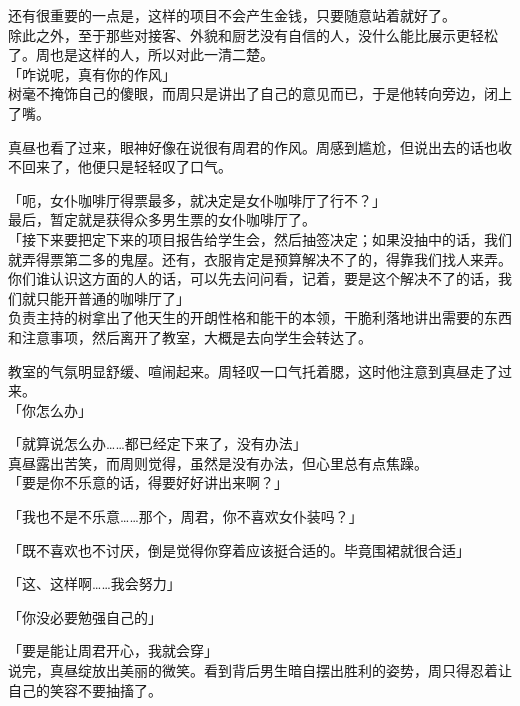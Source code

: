 还有很重要的一点是，这样的项目不会产生金钱，只要随意站着就好了。\\

除此之外，至于那些对接客、外貌和厨艺没有自信的人，没什么能比展示更轻松了。周也是这样的人，所以对此一清二楚。\\

「咋说呢，真有你的作风」\\

树毫不掩饰自己的傻眼，而周只是讲出了自己的意见而已，于是他转向旁边，闭上了嘴。

真昼也看了过来，眼神好像在说很有周君的作风。周感到尴尬，但说出去的话也收不回来了，他便只是轻轻叹了口气。\\

\vspace{2\baselineskip}

「呃，女仆咖啡厅得票最多，就决定是女仆咖啡厅了行不？」\\

最后，暂定就是获得众多男生票的女仆咖啡厅了。\\

「接下来要把定下来的项目报告给学生会，然后抽签决定；如果没抽中的话，我们就弄得票第二多的鬼屋。还有，衣服肯定是预算解决不了的，得靠我们找人来弄。你们谁认识这方面的人的话，可以先去问问看，记着，要是这个解决不了的话，我们就只能开普通的咖啡厅了」\\

负责主持的树拿出了他天生的开朗性格和能干的本领，干脆利落地讲出需要的东西和注意事项，然后离开了教室，大概是去向学生会转达了。

教室的气氛明显舒缓、喧闹起来。周轻叹一口气托着腮，这时他注意到真昼走了过来。\\

「你怎么办」

「就算说怎么办……都已经定下来了，没有办法」\\

真昼露出苦笑，而周则觉得，虽然是没有办法，但心里总有点焦躁。\\

「要是你不乐意的话，得要好好讲出来啊？」

「我也不是不乐意……那个，周君，你不喜欢女仆装吗？」

「既不喜欢也不讨厌，倒是觉得你穿着应该挺合适的。毕竟围裙就很合适」

「这、这样啊……我会努力」

「你没必要勉强自己的」

「要是能让周君开心，我就会穿」\\

说完，真昼绽放出美丽的微笑。看到背后男生暗自摆出胜利的姿势，周只得忍着让自己的笑容不要抽搐了。
